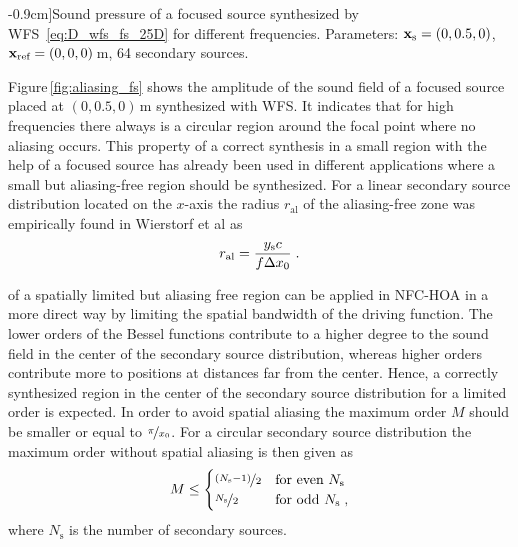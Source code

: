 %
\begin{figure*}[b]
    \small
    
    \caption[][-0.9cm]{Sound pressure of a focused source
    synthesized by
    \ac{WFS}~\protect\eqref{eq:D_wfs_fs_25D} for different frequencies. Parameters:
    $\mathbf{x}_\text{s} = (0,0.5,0)$, $\mathbf{x}_\text{ref} = (0,0,0)$\,m, 64 secondary sources.
    }
    \label{fig:aliasing_fs}
\end{figure*}
%
Figure\,\ref{fig:aliasing_fs} shows the
amplitude of the sound field of a focused source placed at $(0,0.5,0)$\,m
synthesized with \twohalfD \ac{WFS}. It indicates that for high frequencies
there always is a circular region around the focal point where no aliasing
occurs. This property of a correct synthesis in a small region with the help of
a focused source has already been used in different applications where a
small but aliasing-free region should be
synthesized.\autocite[E.g.][]{Spors2010b}
For a linear secondary source distribution located on the $x$-axis
the radius $r_\text{al}$ of the aliasing-free zone was empirically found
in Wierstorf et al\autocite[][(12)]{Wierstorf2013b} as
%
\begin{equation}
    r_\text{al} = \frac{y_\text{s}c}{f\Delta x_0} \;.
\end{equation}

 of a spatially limited but aliasing free region can be applied in
\ac{NFC-HOA} in a more direct way by limiting the spatial bandwidth of the driving
function. The lower orders of the Bessel functions contribute to a higher degree to the sound
field in the center of the secondary source distribution, whereas higher orders
contribute more to positions at distances far from the
center.\autocite[][Sect.\,2.2.2]{Ahrens2012}
Hence, a correctly synthesized region in the center of the
secondary source distribution for a limited order is expected.
In order to avoid spatial aliasing the maximum
order $M$ should be smaller or equal to $\nicefrac{\pi}{x_0}$. For a circular
secondary source distribution the maximum order without spatial aliasing is then
given as
%
\begin{equation}
    M \le
    \begin{cases}
        \nicefrac{(N_\text{s}-1)}{2} & \text{for even } N_\text{s} \\
        \nicefrac{N_\text{s}}{2} & \text{for odd } N_\text{s} \qc
    \end{cases}
    \label{eq:nfchoa_order}
\end{equation}
%
where $N_\text{s}$ is the number of secondary sources.

